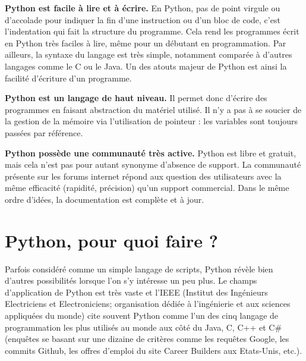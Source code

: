 \documentclass[12pt, a4paper]{article}
\begin{document}
\textbf{Python est facile à lire et à écrire.} En Python, pas de point virgule ou d'accolade pour indiquer la fin d'une instruction ou d'un bloc de code, c'est l'indentation qui fait la structure du programme. Cela rend les programmes écrit en Python très faciles à lire, même pour un débutant en programmation. Par ailleurs, la syntaxe du langage est très simple, notamment comparée à d'autres langages comme le C ou le Java. Un des atouts majeur de Python est ainsi la facilité d'écriture d'un programme.

\textbf{Python est un langage de haut niveau.} Il permet donc d'écrire des programmes en faisant abstraction du matériel utilisé. Il n'y a pas à se soucier de la gestion de la mémoire via l'utilisation de pointeur : les variables sont toujours passées par référence.

\textbf{Python possède une communauté très active.} Python est libre et gratuit, mais cela n'est pas pour autant synonyme d'absence de support. La communauté présente sur les forums internet répond aux question des utilisateurs avec la même efficacité (rapidité, précision) qu'un support commercial. Dans le même ordre d'idées, la documentation est complète et à jour.



\section{Python, pour quoi faire ?}
Parfois considéré comme un simple langage de scripts, Python révèle bien d'autres possibilités lorsque l'on s'y intéresse un peu plus. Le champs d'application de Python est très vaste et l'IEEE (Institut des Ingénieurs Electriciens et Electroniciens; organisation dédiée à l'ingénierie et aux sciences appliquées du monde) cite souvent Python comme l'un des cinq langage de programmation les plus utilisés au monde aux côté du Java, C, C++ et C\# (enquêtes se basant sur une dizaine de critères comme les requêtes Google, les commits Github, les offres d'emploi du site Career Builders aux Etats-Unis, etc.).
\end{document}
